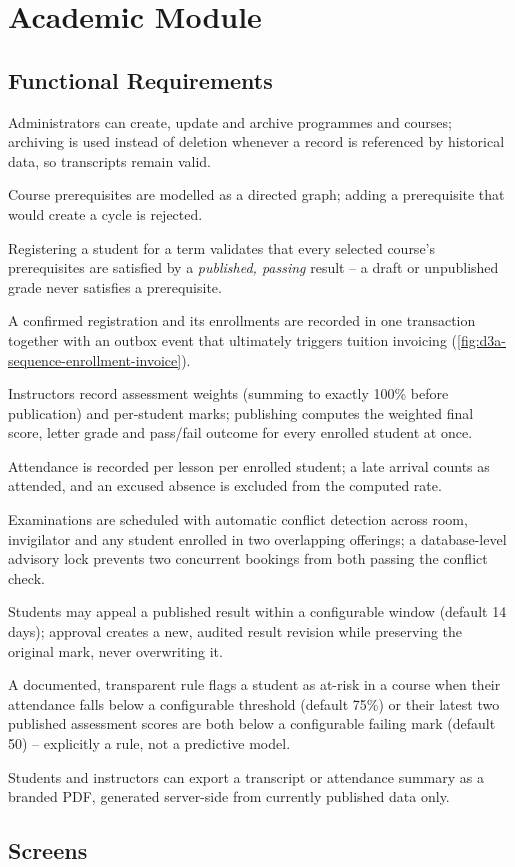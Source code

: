 \section{Academic Module}
\label{sec:academic-module}

\subsection{Functional Requirements}
\begin{reqlist}
  \item Administrators can create, update and archive programmes and courses;
    archiving is used instead of deletion whenever a record is referenced by
    historical data, so transcripts remain valid.
  \item Course prerequisites are modelled as a directed graph; adding a
    prerequisite that would create a cycle is rejected.
  \item Registering a student for a term validates that every selected
    course's prerequisites are satisfied by a \emph{published, passing}
    result -- a draft or unpublished grade never satisfies a prerequisite.
  \item A confirmed registration and its enrollments are recorded in one
    transaction together with an outbox event that ultimately triggers
    tuition invoicing (\cref{fig:d3a-sequence-enrollment-invoice}).
  \item Instructors record assessment weights (summing to exactly 100\% before
    publication) and per-student marks; publishing computes the weighted
    final score, letter grade and pass/fail outcome for every enrolled
    student at once.
  \item Attendance is recorded per lesson per enrolled student; a late arrival
    counts as attended, and an excused absence is excluded from the
    computed rate.
  \item Examinations are scheduled with automatic conflict detection across
    room, invigilator and any student enrolled in two overlapping offerings;
    a database-level advisory lock prevents two concurrent bookings from
    both passing the conflict check.
  \item Students may appeal a published result within a configurable window
    (default 14 days); approval creates a new, audited result revision while
    preserving the original mark, never overwriting it.
  \item A documented, transparent rule flags a student as at-risk in a
    course when their attendance falls below a configurable threshold
    (default 75\%) or their latest two published assessment scores are both
    below a configurable failing mark (default 50) -- explicitly a rule, not
    a predictive model.
  \item Students and instructors can export a transcript or attendance
    summary as a branded PDF, generated server-side from currently published
    data only.
\end{reqlist}

\subsection{Screens}
